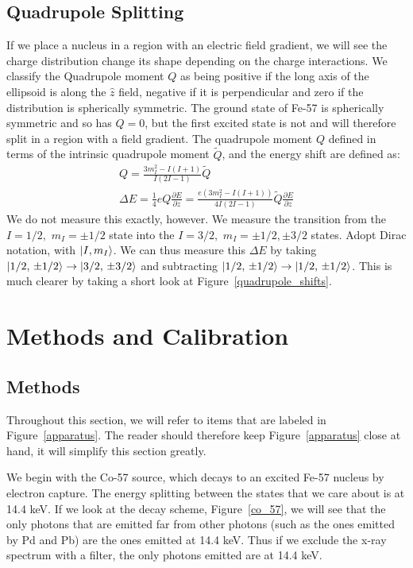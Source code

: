 \documentclass[reprint, nobibnotes, amssymb, amsmath, amsfonts, mathtools, mathrsfs, floatfix]{revtex4-1}
\begin{document}
      \subsection{Quadrupole Splitting}
        If we place a nucleus in a region with an electric field gradient, we will see the charge distribution change its shape depending on the charge interactions.  We classify the Quadrupole moment $Q$ as being positive if the long axis of the ellipsoid is along the $\hat{z}$ field, negative if it is perpendicular and zero if the distribution is spherically symmetric.  The ground state of Fe-57 is spherically symmetric and so has $Q = 0$, but the first excited state is not and will therefore split in a region with a field gradient.  The quadrupole moment $Q$ defined in terms of the intrinsic quadrupole moment $\tilde{Q}$, and the energy shift are defined as:
        \begin{gather}
          Q = \frac{3 m_I^2 - I(I+1)}{I(2I-1)}\tilde{Q} \label{quadrupole_moment} \\
          \Delta E = \frac{1}{4}eQ\frac{\partial E}{\partial z} = \frac{e\left(3 m_I^2 - I(I+1)\right)}{4I(2I-1)}\tilde{Q}\frac{\partial E}{\partial z} \label{quadrupole_shift}
        \end{gather}
        We do not measure this exactly, however.  We measure the transition from the $I = 1/2,\,\, m_I = \pm1/2$ state into the $I = 3/2,\,\, m_I = \pm1/2, \pm3/2$ states.  Adopt Dirac notation, with $\ket{I, m_I}$.  We can thus measure this $\Delta E$ by taking $\ket{1/2,\,\pm1/2} \rightarrow \ket{3/2,\,\pm3/2}$ and subtracting $\ket{1/2,\,\pm1/2} \rightarrow \ket{1/2,\,\pm1/2}$.  This is much clearer by taking a short look at Figure~\ref{quadrupole_shifts}.

  \section{Methods and Calibration}
    \subsection{Methods}
      Throughout this section, we will refer to items that are labeled in Figure~\ref{apparatus}.  The reader should therefore keep Figure~\ref{apparatus} close at hand, it will simplify this section greatly.

      We begin with the Co-57 source, which decays to an excited Fe-57 nucleus by electron capture.  The energy splitting between the states that we care about is at 14.4 keV.  If we look at the decay scheme, Figure~\ref{co_57}, we will see that the only photons that are emitted far from other photons (such as the ones emitted by Pd and Pb) are the ones emitted at 14.4 keV.  Thus if we exclude the x-ray spectrum with a filter, the only photons emitted are at 14.4 keV.
\end{document}
